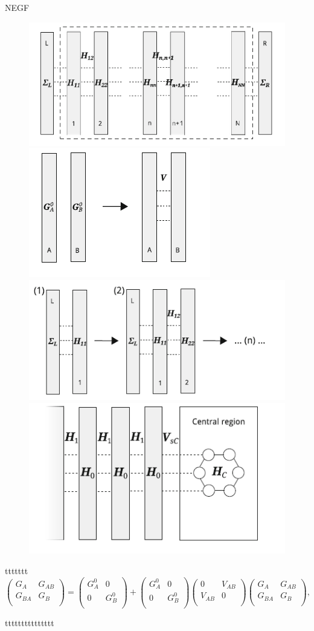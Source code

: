\documentclass[handout,t]{beamer}
\begin{document}
\begin{frame}{NEGF}
	\begin{figure}
    \centering
    \includegraphics[width=0.25\linewidth]{../figures/iteration.png}
    \includegraphics[width=0.25\linewidth]{../figures/greendyson.png}
    \includegraphics[width=0.25\linewidth]{../figures/iterationchannelgreen.png}
    \includegraphics[width=0.25\linewidth]{../figures/leaditerationgreen.png}
    \label{fig:greendyson}
\end{figure}
ttttttt
\begin{equation}
    \left( \begin{matrix}
           {{G}_{A}} & {{G}_{AB}}  \\
           {{G}_{BA}} & {{G}_{B}}  \\
        \end{matrix} \right)=\left( \begin{matrix}
           G_{A}^{0} & 0  \\
           0 & G_{B}^{0}  \\
        \end{matrix} \right)+\left( \begin{matrix}
           G_{A}^{0} & 0  \\
           0 & G_{B}^{0}  \\
        \end{matrix} \right)\left( \begin{matrix}
           0 & {{V}_{AB}}  \\
           {{V}_{AB}} & 0  \\
        \end{matrix} \right)\left( \begin{matrix}
           {{G}_{A}} & {{G}_{AB}}  \\
           {{G}_{BA}} & {{G}_{B}}  \\
        \end{matrix} \right),
\end{equation}

ttttttttttttttt
\end{frame}
\end{document}
